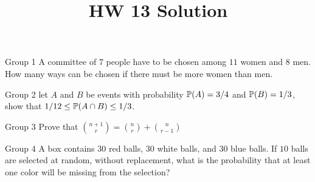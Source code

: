 \documentclass{article}
\title{HW 13 Solution}
\author{}
\date{}
\begin{document}
\maketitle

\iffalse
\begin{problem}
    {Group 1}
    A committee of $7$ people have to be chosen among $11$ women and $8$ men. How many ways can be chosen if there must be more women than men.
\end{problem}

\begin{problem}
    {Group 2}
    let $A$ and $B$ be events with probability $\P{A}=3/4$ and $\P{B}=1/3$, show that $1/12\leq \P{A\cap B}\leq 1/3$.
\end{problem}

\begin{problem}
    {Group 3}
    Prove that $\binom{n+1}{r}=\binom{n}{r}+\binom{n}{r-1}$
\end{problem}

\begin{problem}
    {Group 4}
    A box contains $30$ red balls, $30$ white balls, and $30$ blue balls. If $10$ balls are selected at random, without replacement, what is the probability that at least one color will be missing from the selection?
\end{problem}
\end{document}
